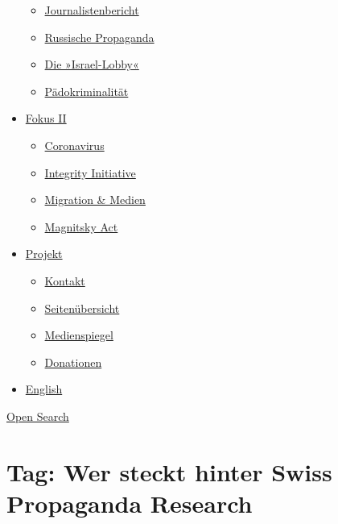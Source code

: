\begin{itemize}
  \begin{itemize}
  \tightlist
  \item
    \href{https://swprs.org/bericht-eines-journalisten/}{Journalistenbericht}
  \item
    \href{https://swprs.org/russische-propaganda/}{Russische Propaganda}
  \item
    \href{https://swprs.org/die-israel-lobby-fakten-und-mythen/}{Die
    »Israel-Lobby«}
  \item
    \href{https://swprs.org/geopolitik-und-paedokriminalitaet/}{Pädokriminalität}
  \end{itemize}
\item
  \href{https://swprs.org/migration-und-medien/}{Fokus II}

  \begin{itemize}
  \tightlist
  \item
    \href{https://swprs.org/covid-19-hinweis-ii/}{Coronavirus}
  \item
    \href{https://swprs.org/die-integrity-initiative/}{Integrity
    Initiative}
  \item
    \href{https://swprs.org/migration-und-medien/}{Migration \& Medien}
  \item
    \href{https://swprs.org/der-fall-magnitsky/}{Magnitsky Act}
  \end{itemize}
\item
  \href{https://swprs.org/kontakt/}{Projekt}

  \begin{itemize}
  \tightlist
  \item
    \href{https://swprs.org/kontakt/}{Kontakt}
  \item
    \href{https://swprs.org/uebersicht/}{Seitenübersicht}
  \item
    \href{https://swprs.org/medienspiegel/}{Medienspiegel}
  \item
    \href{https://swprs.org/donationen/}{Donationen}
  \end{itemize}
\item
  \href{https://swprs.org/contact/}{English}
\end{itemize}

\protect\hyperlink{}{Open Search}

\hypertarget{tag-wer-steckt-hinter-swiss-propaganda-research}{%
\section{Tag: Wer steckt hinter Swiss Propaganda
Research}\label{tag-wer-steckt-hinter-swiss-propaganda-research}}

